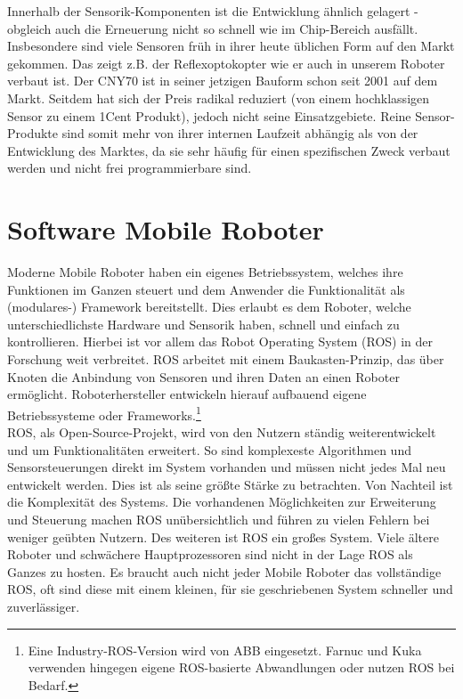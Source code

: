\documentclass[twoside,11pt, a4paper]{report}
\begin{document}
	Innerhalb der Sensorik-Komponenten ist die Entwicklung ähnlich gelagert - obgleich auch die Erneuerung nicht so schnell wie im Chip-Bereich ausfällt. Insbesondere sind viele Sensoren früh in ihrer heute üblichen Form auf den Markt gekommen. Das zeigt z.B. der Reflexoptokopter wie er auch in unserem Roboter verbaut ist. Der CNY70 ist in seiner jetzigen Bauform schon seit 2001 auf dem Markt. Seitdem hat sich der Preis radikal reduziert (von einem hochklassigen Sensor zu einem 1Cent Produkt), jedoch nicht seine Einsatzgebiete. Reine Sensor-Produkte sind somit mehr von ihrer internen Laufzeit abhängig als von der Entwicklung des Marktes, da sie sehr häufig für einen spezifischen Zweck verbaut werden und nicht frei programmierbare sind. 
	
	
	\section{Software Mobile Roboter}
	Moderne Mobile Roboter haben ein eigenes Betriebssystem, welches ihre Funktionen im Ganzen steuert und dem Anwender die Funktionalität als (modulares-) Framework bereitstellt. Dies erlaubt es dem Roboter, welche unterschiedlichste Hardware und Sensorik haben, schnell und einfach zu kontrollieren. Hierbei ist vor allem das Robot Operating System (ROS) in der Forschung weit verbreitet. ROS arbeitet mit einem Baukasten-Prinzip, das über Knoten die Anbindung von Sensoren und ihren Daten an einen Roboter ermöglicht. Roboterhersteller entwickeln hierauf aufbauend eigene Betriebssysteme oder Frameworks.\footnote{Eine Industry-ROS-Version wird von ABB eingesetzt. Farnuc und Kuka verwenden hingegen eigene ROS-basierte Abwandlungen oder nutzen ROS bei Bedarf.}\\
	ROS, als Open-Source-Projekt, wird von den Nutzern ständig weiterentwickelt und um Funktionalitäten erweitert. So sind komplexeste Algorithmen und Sensorsteuerungen direkt im System vorhanden und müssen nicht jedes Mal neu entwickelt werden. Dies ist als seine größte Stärke zu betrachten. Von Nachteil ist die Komplexität des Systems. Die vorhandenen Möglichkeiten zur Erweiterung und Steuerung machen ROS unübersichtlich und führen zu vielen Fehlern bei weniger geübten Nutzern. Des weiteren ist ROS ein großes System. Viele ältere Roboter und schwächere Hauptprozessoren sind nicht in der Lage ROS als Ganzes zu hosten. Es braucht auch nicht jeder Mobile Roboter das vollständige ROS, oft sind diese mit einem kleinen, für sie geschriebenen System schneller und zuverlässiger. \\
\end{document}
